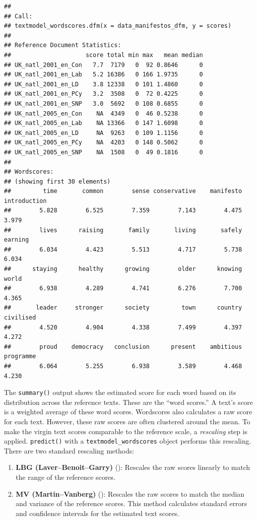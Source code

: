 \documentclass[
]{book}
\providecommand{\tightlist}{%
  \setlength{\itemsep}{0pt}\setlength{\parskip}{0pt}}
\begin{document}
\begin{verbatim}
## 
## Call:
## textmodel_wordscores.dfm(x = data_manifestos_dfm, y = scores)
## 
## Reference Document Statistics:
##                     score total min max   mean median
## UK_natl_2001_en_Con   7.7  7179   0  92 0.8646      0
## UK_natl_2001_en_Lab   5.2 16386   0 166 1.9735      0
## UK_natl_2001_en_LD    3.8 12338   0 101 1.4860      0
## UK_natl_2001_en_PCy   3.2  3508   0  72 0.4225      0
## UK_natl_2001_en_SNP   3.0  5692   0 108 0.6855      0
## UK_natl_2005_en_Con    NA  4349   0  46 0.5238      0
## UK_natl_2005_en_Lab    NA 13366   0 147 1.6098      0
## UK_natl_2005_en_LD     NA  9263   0 109 1.1156      0
## UK_natl_2005_en_PCy    NA  4203   0 148 0.5062      0
## UK_natl_2005_en_SNP    NA  1508   0  49 0.1816      0
## 
## Wordscores:
## (showing first 30 elements)
##         time       common        sense conservative    manifesto introduction 
##        5.828        6.525        7.359        7.143        4.475        3.979 
##        lives      raising       family       living       safely      earning 
##        6.034        4.423        5.513        4.717        5.738        6.034 
##      staying      healthy      growing        older      knowing        world 
##        6.938        4.289        4.741        6.276        7.700        4.365 
##       leader     stronger      society         town      country    civilised 
##        4.520        4.904        4.338        7.499        4.397        4.272 
##        proud    democracy   conclusion      present    ambitious    programme 
##        6.064        5.255        6.938        3.589        4.468        4.230
\end{verbatim}

The \texttt{summary()} output shows the estimated score for each word based on its distribution across the reference texts. These are the ``word scores.'' A text's score is a weighted average of these word scores. Wordscores also calculates a raw score for each text. However, these raw scores are often clustered around the mean. To make the virgin text scores comparable to the reference scale, a \emph{rescaling} step is applied. \texttt{predict()} with a \texttt{textmodel\_wordscores} object performs this rescaling. There are two standard rescaling methods:

\begin{enumerate}
\def\labelenumi{\arabic{enumi}.}
\tightlist
\item
  \textbf{LBG (Laver--Benoit--Garry)} (): Rescales the raw scores linearly to match the range of the reference scores.
\item
  \textbf{MV (Martin--Vanberg)} (): Rescales the raw scores to match the median and variance of the reference scores. This method calculates standard errors and confidence intervals for the estimated text scores.
\end{enumerate}
\end{document}
